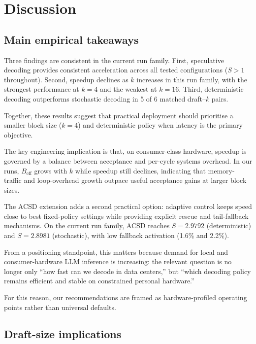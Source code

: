 \section{Discussion}
\label{sec:discussion}

\subsection{Main empirical takeaways}

Three findings are consistent in the current run family. First, speculative decoding
provides consistent acceleration across all tested configurations
($S>1$ throughout). Second, speedup declines as $k$ increases in this run
family, with the strongest performance at $k{=}4$ and the weakest at
$k{=}16$. Third, deterministic decoding outperforms stochastic decoding in 5 of
6 matched draft--$k$ pairs.

Together, these results suggest that practical deployment should prioritise a
smaller block size ($k{=}4$) and deterministic policy when latency is the
primary objective.

The key engineering implication is that, on consumer-class hardware, speedup
is governed by a balance between acceptance and per-cycle systems overhead.
In our runs, $B_{\text{eff}}$ grows with $k$ while speedup still declines,
indicating that memory-traffic and loop-overhead growth outpace useful
acceptance gains at larger block sizes.

The ACSD extension adds a second practical option: adaptive control keeps
speed close to best fixed-policy settings while providing explicit rescue and
tail-fallback mechanisms. On the current run family, ACSD reaches
$S{=}2.9792$ (deterministic) and $S{=}2.8981$ (stochastic), with low fallback
activation (1.6\% and 2.2\%).

From a positioning standpoint, this matters because demand for local and
consumer-hardware LLM inference is increasing: the relevant question is no
longer only ``how fast can we decode in data centers,'' but ``which decoding
policy remains efficient and stable on constrained personal hardware.''

For this reason, our recommendations are framed as hardware-profiled operating
points rather than universal defaults.

\subsection{Draft-size implications}

